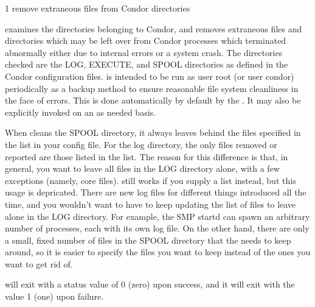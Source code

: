\begin{ManPage}{\label{man-condor-preen}}{1}
{remove extraneous files from Condor directories}
\Synopsis {}


\Description 

 examines the directories belonging to Condor, 
and removes extraneous files and directories which may be left over from
Condor processes which terminated abnormally either due to internal errors or
a system crash. The directories checked are the LOG, EXECUTE, and SPOOL
directories as defined in the Condor configuration files.  is
intended to be run as user root (or user condor) periodically as a backup
method to ensure reasonable file system cleanliness in the face of
errors. This is done automatically by default by the . 
It may also be explicitly invoked on an as needed basis.

When  cleans the SPOOL directory, it always leaves
behind the files specified in the  list in
your config file.
For the log directory, the only files removed or reported are those
listed in the   list.
The reason for this difference is that, in general, you want to leave
all files in the LOG directory alone, with a few exceptions (namely,
core files).
 still works if you supply a 
list instead, but this usage is depricated.
There are new log files for different things introduced all the time,
and you wouldn't want to have to keep updating the list of files to
leave alone in the LOG directory.
For example, the SMP startd can spawn an arbitrary number of
 processes, each with its own log file.  
On the other hand, there are only a small, fixed number of files in
the SPOOL directory that the  needs to keep around, so
it is easier to specify the files you want to keep instead of the ones
you want to get rid of.

\begin{Options}




\end{Options}

\ExitStatus

 will exit with a status value of 0 (zero) upon success,
and it will exit with the value 1 (one) upon failure.

\end{ManPage}
